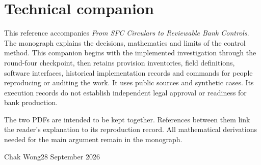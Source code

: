 \documentclass[12pt,a4paper,oneside,openany]{book}
\renewcommand{\chaptermark}[1]{\markboth{Chapter \thechapter}{}}
\begin{document}
\raggedbottom
\frontmatter
\chapter*{Technical companion}

This reference accompanies \emph{From SFC Circulars to Reviewable Bank Controls}.
The monograph explains the decisions, mathematics and limits of the control
method. This companion begins with the implemented investigation through the
round-four checkpoint, then retains provision inventories, field definitions,
software interfaces, historical implementation records and commands for people
reproducing or auditing the work. It uses public sources and synthetic cases.
Its execution records do not establish independent legal approval or readiness
for bank production.

The two PDFs are intended to be kept together. References between them link the
reader's explanation to its reproduction record. All mathematical derivations
needed for the main argument remain in the monograph.

Chak Wong\hfill 28 September 2026

\tableofcontents
\mainmatter
\appendix
{}
\renewcommand{\chaptermark}[1]{\markboth{Appendix \thechapter}{}}







\backmatter
\begingroup
\raggedright


\endgroup
\end{document}
